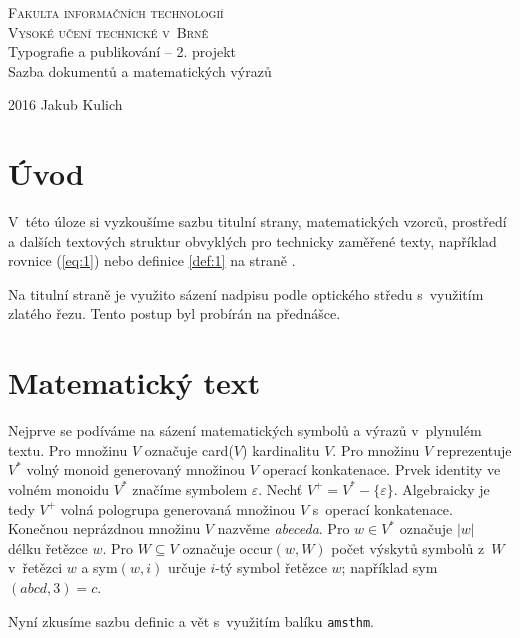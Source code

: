 \documentclass[11pt,a4paper,twocolumn]{article}
\theoremstyle{definition}
\begin{document}
\begin{titlepage}
\begin{center}
\Huge
\textsc{
    Fakulta informačních technologií \\ [-.35em]
Vysoké učení technické v~Brně} \\
\LARGE
Typografie a publikování -- 2. projekt \\ [-.25em]
Sazba dokumentů a matematických výrazů

\end{center}
{\Large 2016 \hfill
Jakub Kulich}
\end{titlepage}

\section*{Úvod}
V~této úloze si vyzkoušíme sazbu titulní strany, matematických vzorců, prostředí a dalších textových struktur obvyklých pro technicky zaměřené texty, například rovnice (\ref{eq:1}) nebo definice \ref{def:1} na straně \pageref{def:1}. 

Na titulní straně je využito sázení nadpisu podle optického středu s~využitím zlatého řezu. Tento postup byl probírán na přednášce.


\section{Matematický text}
Nejprve se podíváme na sázení matematických symbolů a výrazů v~plynulém textu. Pro množinu $V$ označuje card($V$) kardinalitu $V$.
Pro množinu $V$ reprezentuje $V^*$ volný monoid generovaný množinou $V$ operací konkatenace.
Prvek identity ve volném monoidu $V^*$ značíme symbolem $\varepsilon$.
Nechť $V^+ = V^* - \{\varepsilon\}$. Algebraicky je tedy $V^+$ volná pologrupa generovaná množinou $V$ s~operací konkatenace.
Konečnou neprázdnou množinu $V$ nazvěme \textit{abeceda}.
Pro $w \in V^*$ označuje $|w|$ délku řetězce $w$. Pro $W \subseteq V$ označuje occur$(w,W)$ počet výskytů symbolů z~$W$ v~řetězci $w$ a sym$(w,i)$ určuje $i$-tý symbol řetězce $w$; například sym$(abcd,3) = c$. 

Nyní zkusíme sazbu definic a vět s~využitím balíku \texttt{amsthm}.
\end{document}
